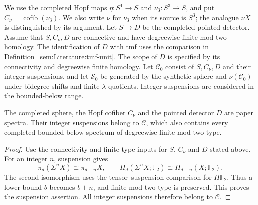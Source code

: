 We use the completed Hopf maps $\eta:S^1\to S$ and
$\nu_3:S^3\to S$, and put $C_\nu=\operatorname{cofib}(\nu_3)$.
We also write $\nu$ for $\nu_3$ when its source is $S^3$; the
analogue $\nu X$ is distinguished by its argument. Let $S\to D$ be the
completed pointed detector. Assume that
$S,C_\nu,D$ are connective and have degreewise finite mod-two homology.
The identification of $D$ with tmf uses the comparison in
Definition~\ref{sem:Literature:tmf-unit}. The scope of $D$ is specified by its connectivity and degreewise finite homology. Let $\mathcal C_0$ consist of
$S,C_\nu,D$ and their integer suspensions, and let $\mathcal S_0$ be
generated by the synthetic sphere and $\nu(\mathcal C_0)$ under bidegree
shifts and finite $\lambda$ quotients. Integer suspensions are considered in the bounded-below range.

\begin{proposition}
\label{sem:AdamsSynthetic:paper-spectrum-instances}
The completed sphere, the Hopf cofiber $C_\nu$ and the pointed detector $D$ are paper spectra. Their integer suspensions belong to $\mathcal C$, which also contains every completed bounded-below spectrum of degreewise finite mod-two type.
\end{proposition}
\begin{proof}
Use the connectivity and finite-type inputs for $S$, $C_\nu$ and $D$ stated above. For an integer $n$, suspension gives
\[
\pi_d(\Sigma^nX)\cong\pi_{d-n}X,\qquad
H_d(\Sigma^nX;\mathbb F_2)\cong H_{d-n}(X;\mathbb F_2).
\]
The second isomorphism uses the tensor--suspension comparison for $H\mathbb F_2$. Thus a lower bound $b$ becomes $b+n$, and finite mod-two type is preserved. This proves the suspension assertion. All integer suspensions therefore belong to $\mathcal C$.
\end{proof}

